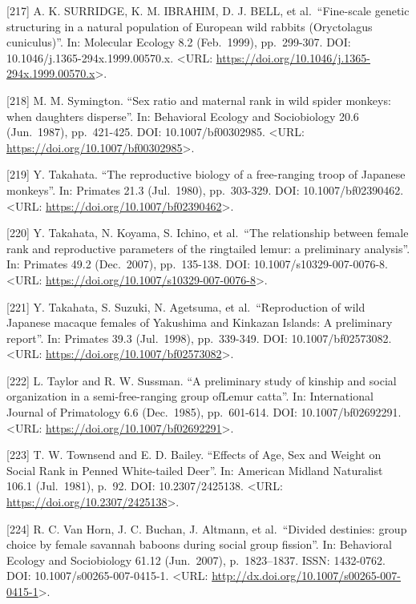 \documentclass[
]{article}
\begin{document}
{[}217{]} A. K. SURRIDGE, K. M. IBRAHIM, D. J. BELL, et al.~``Fine-scale
genetic structuring in a natural population of European wild rabbits
(Oryctolagus cuniculus)''. In: Molecular Ecology 8.2 (Feb.~1999),
pp.~299-307. DOI: 10.1046/j.1365-294x.1999.00570.x. \textless URL:
\url{https://doi.org/10.1046/j.1365-294x.1999.00570.x}\textgreater.

{[}218{]} M. M. Symington. ``Sex ratio and maternal rank in wild spider
monkeys: when daughters disperse''. In: Behavioral Ecology and
Sociobiology 20.6 (Jun.~1987), pp.~421-425. DOI: 10.1007/bf00302985.
\textless URL: \url{https://doi.org/10.1007/bf00302985}\textgreater.

{[}219{]} Y. Takahata. ``The reproductive biology of a free-ranging
troop of Japanese monkeys''. In: Primates 21.3 (Jul.~1980), pp.~303-329.
DOI: 10.1007/bf02390462. \textless URL:
\url{https://doi.org/10.1007/bf02390462}\textgreater.

{[}220{]} Y. Takahata, N. Koyama, S. Ichino, et al.~``The relationship
between female rank and reproductive parameters of the ringtailed lemur:
a preliminary analysis''. In: Primates 49.2 (Dec.~2007), pp.~135-138.
DOI: 10.1007/s10329-007-0076-8. \textless URL:
\url{https://doi.org/10.1007/s10329-007-0076-8}\textgreater.

{[}221{]} Y. Takahata, S. Suzuki, N. Agetsuma, et al.~``Reproduction of
wild Japanese macaque females of Yakushima and Kinkazan Islands: A
preliminary report''. In: Primates 39.3 (Jul.~1998), pp.~339-349. DOI:
10.1007/bf02573082. \textless URL:
\url{https://doi.org/10.1007/bf02573082}\textgreater.

{[}222{]} L. Taylor and R. W. Sussman. ``A preliminary study of kinship
and social organization in a semi-free-ranging group ofLemur catta''.
In: International Journal of Primatology 6.6 (Dec.~1985), pp.~601-614.
DOI: 10.1007/bf02692291. \textless URL:
\url{https://doi.org/10.1007/bf02692291}\textgreater.

{[}223{]} T. W. Townsend and E. D. Bailey. ``Effects of Age, Sex and
Weight on Social Rank in Penned White-tailed Deer''. In: American
Midland Naturalist 106.1 (Jul.~1981), p.~92. DOI: 10.2307/2425138.
\textless URL: \url{https://doi.org/10.2307/2425138}\textgreater.

{[}224{]} R. C. Van Horn, J. C. Buchan, J. Altmann, et al.~``Divided
destinies: group choice by female savannah baboons during social group
fission''. In: Behavioral Ecology and Sociobiology 61.12 (Jun.~2007),
p.~1823--1837. ISSN: 1432-0762. DOI: 10.1007/s00265-007-0415-1.
\textless URL:
\url{http://dx.doi.org/10.1007/s00265-007-0415-1}\textgreater.
\end{document}
